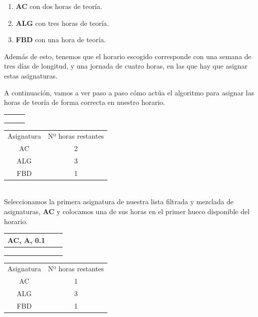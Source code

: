 \begin{enumerate}[$\bullet$]
    \item \textbf{AC} con dos horas de teoría.
    \item \textbf{ALG} con tres horas de teoría.
    \item \textbf{FBD} con una hora de teoría.
\end{enumerate}

Además de esto, tenemos que el horario escogido corresponde con una semana de tres días de longitud, y una jornada de cuatro horas, en las que hay que asignar estas asignaturas.



A continuación, vamos a ver paso a paso cómo actúa el algoritmo para asignar las horas de teoría de forma correcta en nuestro horario.\\

\begin{minipage}{0.5\textwidth}    
\begin{tabular}{| c | c | c |}
\hline
 &  &  \\
 \hline
 &  &  \\
 \hline
 &  &  \\
 \hline
 &  &  \\
 \hline 
\end{tabular}
\end{minipage}
\begin{minipage}{0.5\textwidth}
\begin{tabular}{c | c}
Asignatura & Nº horas restantes \\
AC & 2 \\
ALG & 3 \\
FBD & 1
\end{tabular}
\end{minipage}

~\\
Seleccionamos la primera asignatura de nuestra lista filtrada y mezclada de asignaturas, \textbf{AC} y colocamos una de sus horas en el primer hueco disponible del horario.\\

\begin{minipage}{0.5\textwidth}    
\begin{tabular}{| c | c | c |}
\hline
AC, A, 0.1 &  &  \\
 \hline
 &  &  \\
 \hline
 &  &  \\
 \hline
 &  &  \\
 \hline 
\end{tabular}
\end{minipage}
\begin{minipage}{0.5\textwidth}
\begin{tabular}{c | c}
Asignatura & Nº horas restantes \\
AC & 1 \\
ALG & 3 \\
FBD & 1
\end{tabular}
\end{minipage}

